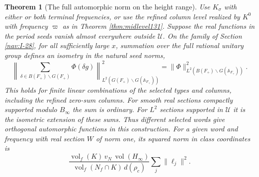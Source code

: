 \documentclass[a4paper,11pt]{article}
\newtheorem{theorem}[proposition]{Theorem}
\theoremstyle{definition}
\theoremstyle{remark}
\numberwithin{equation}{section}
\begin{document}
\begin{theorem}[The full automorphic norm on the height range]
\label{thm:low136}
Use \(K_\sigma\) with either or both terminal frequencies, or
use the refined column level realized by \(K^0\) with frequency
\(\varpi\) as in Theorem \ref{thm:midlevel131}. Suppose the real
functions in the period seeds vanish almost everywhere outside
\(\mathcal U\). On the family of Section \ref{nav:I-28}, for all sufficiently
large \(x\), summation over the full rational unitary group
defines an isometry in the natural seed norms,
\begin{equation}
 \left\|\sum_{\delta\in B(F_+)\backslash G(F_+)}
                         \Phi(\delta g)\right\|^2_{
                  L^2(G(F_+)\backslash G(\mathbb A_{F_+}))}
     =\|\Phi\|^2_{L^2(B(F_+)\backslash G(\mathbb A_{F_+}))}.
 \label{eq:low136}
\end{equation}
This holds for finite linear combinations of the selected types
and columns, including the refined zero-sum columns. For smooth
real sections compactly supported modulo \(B_\infty\) the sum is
ordinary. For \(L^2\) sections supported in \(\mathcal U\) it is
the isometric extension of these sums. Thus different selected
words give orthogonal automorphic functions in this construction.
For a given word and frequency with real section \(W\) of norm
one, its squared norm in class coordinates is
\[
    \frac{\operatorname{vol}_f(K)\,v_N\,\operatorname{vol}(H_\infty)}
         {\operatorname{vol}_f(N_f\cap K)\,d(\rho_c)}
         \sum_j\|\ell_j\|^2 .
\]
\end{theorem}
\end{document}

